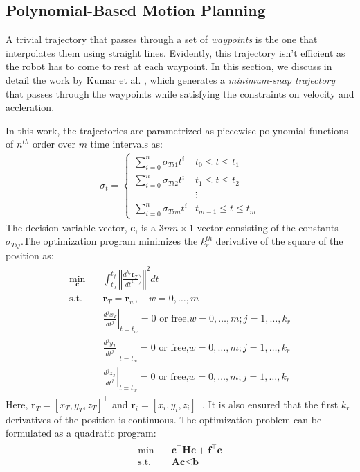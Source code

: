 \subsection{Polynomial-Based Motion Planning}
\label{sec:poly_based_planning}
A trivial trajectory that passes through a set of \textit{waypoints} is the one that interpolates them using straight lines. Evidently, this trajectory isn't efficient as the robot has to come to rest at each waypoint. In this section, we discuss in detail the work by Kumar et al. \cite{mellinger2011minimum}, which generates a \textit{minimum-snap trajectory} that passes through the waypoints while satisfying the constraints on velocity and accleration. 

In this work, the trajectories are parametrized as piecewise polynomial functions of $n^{th}$ order over $m$ time intervals as:
\begin{align}
  \sigma_{t} =
    \begin{cases}
      \sum_{i=0}^n \sigma_{Ti1}t^i& t_0\leq t\leq t_1\\
      \sum_{i=0}^n \sigma_{Ti2}t^i& t_1\leq t\leq t_2\\
      &\vdots\\
      \sum_{i=0}^n \sigma_{Tim}t^i& t_{m-1}\leq t\leq t_m
    \end{cases} 
\end{align}
The decision variable vector, $\textbf{c}$, is a $3mn\times 1$ vector consisting of the constants $\sigma_{T{ij}}$.The optimization program minimizes the $k_r^{th}$ derivative of the square of the position as:
\begin{align}
\begin{split}
\min_{\textbf{c}} \quad & \int_{t_0}^{t_f} \left\Vert\frac{d^{k_r}\textbf{r}_T}{dt^{k_r}})\right\Vert^2 dt\\
\textrm{s.t.} \quad & \textbf{r}_{T}=\textbf{r}_w, \quad w=0,\ldots,m\\
  &\left.\frac{d^j x_T}{dt^j}\right\rvert_{t=t_w}=0\text{ or free,}w=0,\ldots,m;j=1,\ldots,k_r\\
  &\left.\frac{d^j y_T}{dt^j}\right\rvert_{t=t_w}=0\text{ or free,}w=0,\ldots,m;j=1,\ldots,k_r\\
  &\left.\frac{d^j z_T}{dt^j}\right\rvert_{t=t_w}=0\text{ or free,}w=0,\ldots,m;j=1,\ldots,k_r
\end{split}
\end{align}
Here, $\textbf{r}_T=[x_T,y_T,z_T]^\top$ and $\textbf{r}_i=[x_i,y_i,z_i]^\top$. It is also ensured that the first $k_r$ derivatives of the position is continuous. The optimization problem can be formulated as a quadratic program:
\begin{align}
\begin{split}
\min \quad & \textbf{c}^\top \textbf{H} \textbf{c} + \textbf{f}^\top\textbf{c} \\
\textrm{s.t.} \quad &\textbf{Ac}\leq \textbf{b}
\end{split}
\end{align}

